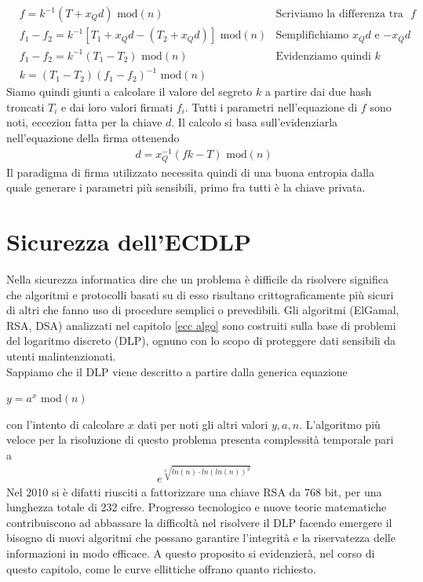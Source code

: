 \documentclass[a4paper,12pt]{tesiinfo}
\begin{document}
\begin{align*}
  &f = k^{-1} (T+x_Qd) \text{ mod}(n) &\text{Scriviamo la differenza tra le due $f$}\\
  &f_1 - f_2 = k^{-1} [T_1+x_Qd - (T_2 + x_Qd)] \text{ mod}(n) &\text{Semplifichiamo $x_Qd$ e $-x_Qd$}\\
  &f_1 - f_2 = k^{-1} (T_1 - T_2) \text{ mod$(n)$} &\text{Evidenziamo quindi $k$}\\
  &k= (T_1 - T_2)(f_1 - f_2)^{-1} \text{ mod$(n)$}
\end{align*}
Siamo quindi giunti a calcolare il valore del segreto $k$ a partire dai due hash troncati $T_i$ e dai loro valori firmati $f_i$. Tutti i parametri nell'equazione di $f$ sono noti, eccezion fatta per la chiave $d$. Il calcolo si basa sull'evidenziarla nell'equazione della firma ottenendo
\begin{align*}
  d = x_Q^{-1}(fk-T) \text{ mod}(n) 
\end{align*}
Il paradigma di firma utilizzato necessita quindi di una buona entropia dalla quale generare i parametri pi\`u sensibili, primo fra tutti \`e la chiave privata.
%
%
%
%
%
%
%
%
%
%
%
%
%
%
%
%
%
%
%
\chapter{Sicurezza dell'ECDLP}
\label{ecdlp}
Nella sicurezza informatica dire che un problema \`e difficile da risolvere significa che algoritmi e protocolli basati su di esso risultano crittograficamente pi\`u sicuri di altri che fanno uso di procedure semplici o prevedibili. Gli algoritmi (ElGamal, RSA, DSA) analizzati nel capitolo \ref{ecc algo} sono costruiti sulla base di problemi del logaritmo discreto (DLP), ognuno con lo scopo di proteggere dati sensibili da utenti malintenzionati.
\\
Sappiamo che il DLP viene descritto a partire dalla generica equazione
\begin{center}
 $y = a^x$ mod$(n)$
\end{center}
con l'intento di calcolare $x$ dati per noti gli altri valori $y, a, n$. L'algoritmo pi\`u veloce \cite{libro 900 pagine, dlp fast1} per la risoluzione di questo problema presenta complessit\`a temporale pari a
\begin{gather}
 e^{\sqrt[3]{ln(n) \cdot ln( ln( n) )^2}}
 \label{dlp enorme}
\end{gather}
Nel 2010 si \`e difatti riusciti a fattorizzare \cite{dlp fast2} una chiave RSA da 768 bit, per una lunghezza totale di 232 cifre. Progresso tecnologico e nuove teorie matematiche contribuiscono ad abbassare la difficolt\`a nel risolvere il DLP facendo emergere il bisogno di nuovi algoritmi che possano garantire l'integrit\`a e la riservatezza delle informazioni in modo efficace. A questo proposito si evidenzier\`a, nel corso di questo capitolo, come le curve ellittiche offrano quanto richiesto. 
\end{document}
